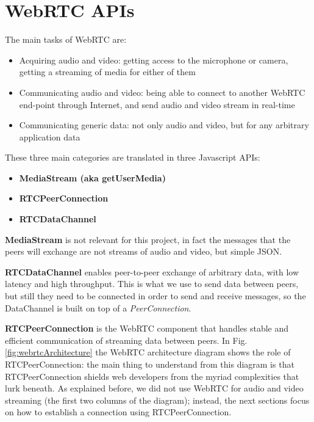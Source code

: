 \section{WebRTC APIs}
\label{sec:webrtc_api}
The main tasks of WebRTC are:
\begin{itemize}
	\item Acquiring audio and video: getting access to the microphone or camera, getting a streaming of media for either of them
	\item Communicating audio and video: being able to connect to another WebRTC end-point through Internet, and send audio and video stream in real-time
	\item Communicating generic data: not only audio and video, but for any arbitrary application data
\end{itemize}
These three main categories are translated in three Javascript APIs:
\begin{itemize}
	\item\textbf{MediaStream (aka getUserMedia) }
	\item\textbf{RTCPeerConnection}
	\item\textbf{RTCDataChannel}
\end{itemize}

\textbf{MediaStream} is not relevant for this project, in fact the messages that the peers will exchange are not streams of audio and video, but simple JSON.

\textbf{RTCDataChannel} enables peer-to-peer exchange of arbitrary data, with low latency and high throughput. This is what we use to send data between peers, but still they need to be connected in order to send and receive messages, so the DataChannel is built on top of a \textit{PeerConnection}.

\textbf{RTCPeerConnection} is the WebRTC component that handles stable and efficient communication of streaming data between peers. In Fig.\ref{fig:webrtcArchitecture} the WebRTC architecture diagram shows the role of RTCPeerConnection: the main thing to understand from this diagram is that RTCPeerConnection shields web developers from the myriad complexities that lurk beneath. As explained before, we did not use WebRTC for audio and video streaming (the first two columns of the diagram); instead, the next sections focus on how to establish a connection using RTCPeerConnection.

